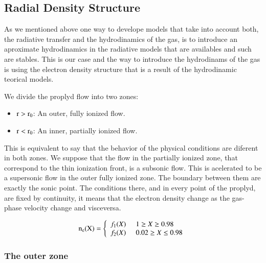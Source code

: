\documentclass[aaspp]{article}
\begin{document}
\subsection{Radial Density Structure}
\label{sec:density}

As we mentioned above one way to develope models that take into account both, the radiative transfer and the hydrodinamics of the gas, is to introduce an aproximate hydrodinamics in the radiative models that are availables and such are stables. This is our case and the way to introduce the hydrodinams of the gas is using the electron density structure that is a result of the hydrodinamic teorical models.

We divide the proplyd flow into two zones:

\begin{itemize}
  \item{$\rm r > r_0$: An outer, fully ionized flow.}
    \item{$\rm r < r_0$: An inner, partially ionized flow.}
\end{itemize}

This is equivalent to say that the behavior of the physical conditions are diferent in both zones. We suppose that the flow in the partially ionized zone, that correspond to the thin ionization front, is a subsonic flow. This is acelerated to be a supersonic flow in the outer fully ionized zone. The boundary between them are exactly the sonic point. The conditions there, and in every point of the proplyd, are fixed by continuity, it means that the electron density change as the gas-phase velocity change and visceversa. 

\begin{equation}
  \rm n_e(X) = \left\lbrace
    \begin{array}{l}
      f_1(X) \;\;\;\;\; 1 \ge X \ge 0.98 \\
      f_2(X) \;\;\;\;\;  0.02 \ge X \le 0.98  \\
    \end{array}
  \right.
\end{equation}

\subsubsection{The outer zone}
\label{sec:outer}
\end{document}
